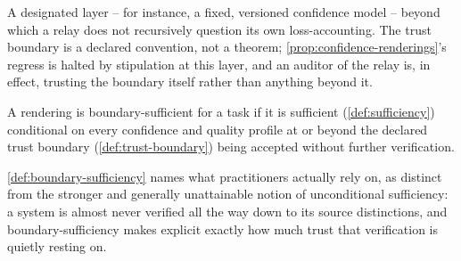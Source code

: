 \begin{definition}
\label{def:trust-boundary}
A designated layer -- for instance, a fixed, versioned confidence model
-- beyond which a relay does not recursively question its own
loss-accounting. The trust boundary is a declared convention, not a
theorem; \cref{prop:confidence-renderings}'s regress is halted by
stipulation at this layer, and an auditor of the relay is, in effect,
trusting the boundary itself rather than anything beyond it.
\end{definition}

\begin{definition}
\label{def:boundary-sufficiency}
A rendering is boundary-sufficient for a task if it is sufficient
(\cref{def:sufficiency}) conditional on every confidence and quality
profile at or beyond the declared trust boundary
(\cref{def:trust-boundary}) being accepted without further verification.
\end{definition}

\cref{def:boundary-sufficiency} names what practitioners actually rely
on, as distinct from the stronger and generally unattainable notion of
unconditional sufficiency: a system is almost never verified all the way
down to its source distinctions, and boundary-sufficiency makes explicit
exactly how much trust that verification is quietly resting on.
